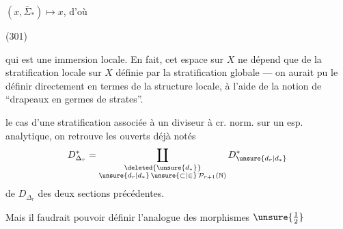 
$(x,\overline{\Sigma}_*)\longmapsto x$, d'où

(301)\quad{}


qui est une immersion locale. En fait, cet espace sur $X$ ne dépend que de la  stratification locale sur $X$ définie par la stratification globale --- on aurait pu le définir directement en termes de la structure locale, à l'aide de la notion de ``drapeaux en germes de strates''. 

  le cas d'une stratification associée à un diviseur à cr. norm. sur un esp. analytique, on retrouve les ouverts déjà notés
\[
D_{\Delta_r}^{*}=\coprod_{\substack{\deleted{\unsure{d_*}}\\\unsure{d_r|d_*}\,\unsure{\subset|\in}\,\mathcal P_{r+1}(\mathbb N)}}D_{\unsure{d_r|d_*}}^{*}
\]
de $D_{\Delta_r}$ des deux sections précédentes.

Mais il faudrait pouvoir définir l'analogue des morphismes $\unsure{\tfrac12}$ 

